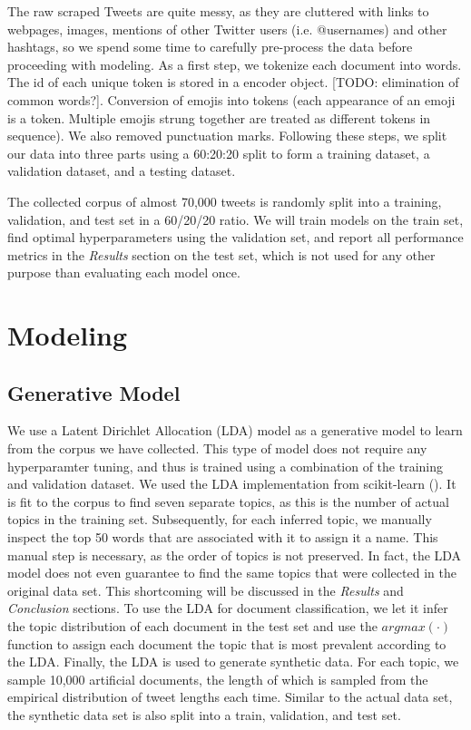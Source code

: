 \documentclass[11pt]{article}
\begin{document}
The raw scraped Tweets are quite messy, as they are cluttered with links to webpages, images, mentions of other Twitter users (i.e. @usernames) and other hashtags, so we spend some time to carefully pre-process the data before proceeding with modeling. As a first step, we tokenize each document into words. The id of each unique token is stored in a encoder object. [TODO: elimination of common words?]. Conversion of emojis into tokens (each appearance of an emoji is a token. Multiple emojis strung together are treated as different tokens in sequence). We also removed punctuation marks. Following these steps, we split our data into three parts using a 60:20:20 split to form a training dataset, a validation dataset, and a testing dataset. 

The collected corpus of almost 70,000 tweets is randomly split into a training, validation, and test set in a 60/20/20 ratio. We will train models on the train set, find optimal hyperparameters using the validation set, and report all performance metrics in the \emph{Results} section on the test set, which is not used for any other purpose than evaluating each model once.



\noindent 



\section{Modeling}
\subsection{Generative Model}
We use a Latent Dirichlet Allocation (LDA) model as a generative model to learn from the corpus we have collected. This type of model does not require any hyperparamter tuning, and thus is trained using a combination of the training and validation dataset. We used the LDA implementation from scikit-learn (\cite{sklearn}). It is fit to the corpus to find seven separate topics, as this is the number of actual topics in the training set. Subsequently, for each inferred topic, we manually inspect the top 50 words that are associated with it to assign it a name. This manual step is necessary, as the order of topics is not preserved. In fact, the LDA model does not even guarantee to find the same topics that were collected in the original data set. This shortcoming will be discussed in the \emph{Results} and \emph{Conclusion} sections. 
To use the LDA for document classification,  we let it infer the topic distribution of each document in the test set and use the $argmax(\cdot)$ function to assign each document the topic that is most prevalent according to the LDA.
Finally, the LDA is used to generate synthetic data. For each topic, we sample 10,000 artificial documents, the length of which is sampled from the empirical distribution of tweet lengths each time. Similar to the actual data set, the synthetic data set is also split into a train, validation, and test set.
\end{document}
